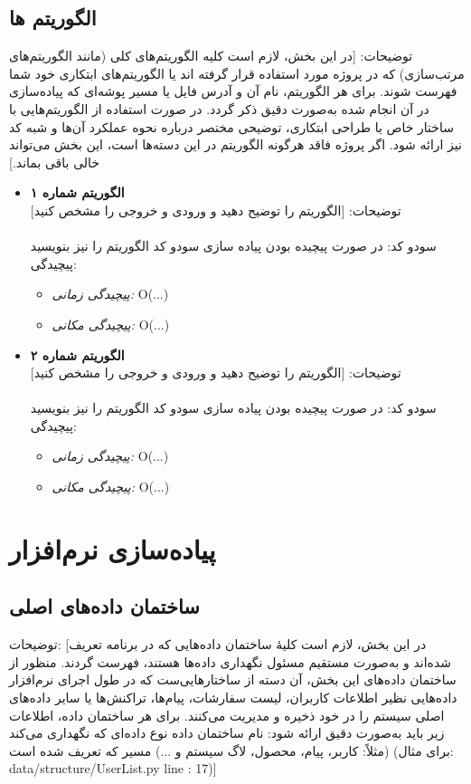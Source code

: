 \documentclass[12pt]{article}
\begin{document}
\subsection{الگوریتم ها}
	توضیحات: [در این بخش، لازم است کلیه الگوریتم‌های کلی (مانند الگوریتم‌های مرتب‌سازی) که در پروژه مورد استفاده قرار گرفته اند یا  الگوریتم‌های ابتکاری خود شما فهرست شوند. برای هر الگوریتم، نام آن و آدرس فایل یا مسیر پوشه‌ای که پیاده‌سازی در آن انجام شده به‌صورت دقیق ذکر گردد. در صورت استفاده از الگوریتم‌هایی با ساختار خاص یا طراحی ابتکاری، توضیحی مختصر درباره نحوه عملکرد آن‌ها و شبه کد نیز ارائه شود. اگر پروژه فاقد هرگونه الگوریتم در این دسته‌ها است، این بخش می‌تواند خالی باقی بماند.]
\begin{itemize}[noitemsep]
	\item \textbf{الگوریتم شماره ۱}\\
	توضیحات: [الگوریتم را توضیح دهید و ورودی و خروجی را مشخص کنید]\\
	\lipsum[9]
	\\[0.2cm]
	سودو کد:
	در صورت پیچیده بودن پیاده سازی سودو کد الگوریتم را نیز بنویسید\\[0.2cm]
	پیچیدگی:
	\begin{itemize}[noitemsep]
		\item \textit{پیچیدگی زمانی:} O(...)
		\item \textit{پیچیدگی مکانی:} O(...)
	\end{itemize}		
	\item \textbf{الگوریتم شماره ۲}\\
	توضیحات: [الگوریتم را توضیح دهید و ورودی و خروجی را مشخص کنید]\\
	\lipsum[9]
	\\[0.2cm]
	سودو کد:
	در صورت پیچیده بودن پیاده سازی سودو کد الگوریتم را نیز بنویسید\\[0.2cm]
	پیچیدگی:
	\begin{itemize}[noitemsep]
		\item \textit{پیچیدگی زمانی:} O(...)
		\item \textit{پیچیدگی مکانی:} O(...)
	\end{itemize}
\end{itemize}

\newpage
\section{ پیاده‌سازی نرم‌افزار}
\subsection{ساختمان داده‌های اصلی }
	توضیحات: [در این بخش، لازم است کلیهٔ ساختمان داده‌هایی که در برنامه تعریف شده‌اند و به‌صورت مستقیم مسئول نگهداری داده‌ها هستند، فهرست گردند. منظور از ساختمان داده‌های این بخش، آن دسته از ساختارهایی‌ست که در طول اجرای نرم‌افزار داده‌هایی نظیر اطلاعات کاربران، لیست سفارشات، پیام‌ها، تراکنش‌ها یا سایر داده‌های اصلی سیستم را در خود ذخیره و مدیریت می‌کنند.
برای هر ساختمان داده، اطلاعات زیر باید به‌صورت دقیق ارائه شود:
نام ساختمان داده
نوع داده‌ای که نگهداری می‌کند (مثلاً: کاربر، پیام، محصول، لاگ سیستم و ...)
مسیر که تعریف شده است (برای مثال: data/structure/UserList.py
line : 17)]\\
\end{document}
